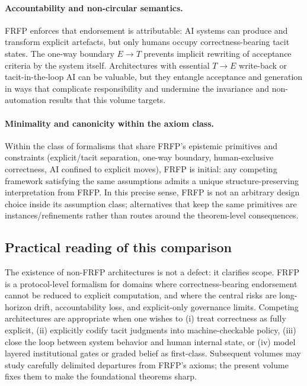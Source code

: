 \paragraph{Accountability and non-circular semantics.}
FRFP enforces that endorsement is attributable: AI systems can produce and transform explicit
artefacts, but only humans occupy correctness-bearing tacit states. The one-way boundary \(E\to T\)
prevents implicit rewriting of acceptance criteria by the system itself. Architectures with essential
\(T\to E\) write-back or tacit-in-the-loop AI can be valuable, but they entangle acceptance and
generation in ways that complicate responsibility and undermine the invariance and non-automation
results that this volume targets.

\paragraph{Minimality and canonicity within the axiom class.}
Within the class of formalisms that share FRFP's epistemic primitives and constraints (explicit/tacit
separation, one-way boundary, human-exclusive correctness, AI confined to explicit moves), FRFP is
initial: any competing framework satisfying the same assumptions admits a unique structure-preserving
interpretation from FRFP. In this precise sense, FRFP is not an arbitrary design choice inside its
assumption class; alternatives that keep the same primitives are instances/refinements rather than
routes around the theorem-level consequences.

\subsection{Practical reading of this comparison}

The existence of non-FRFP architectures is not a defect: it clarifies scope. FRFP is a protocol-level
formalism for domains where correctness-bearing endorsement cannot be reduced to explicit computation,
and where the central risks are long-horizon drift, accountability loss, and explicit-only governance
limits. Competing architectures are appropriate when one wishes to (i) treat correctness as fully
explicit, (ii) explicitly codify tacit judgments into machine-checkable policy, (iii) close the loop
between system behavior and human internal state, or (iv) model layered institutional gates or graded
belief as first-class. Subsequent volumes may study carefully delimited departures from FRFP's axioms;
the present volume fixes them to make the foundational theorems sharp.
